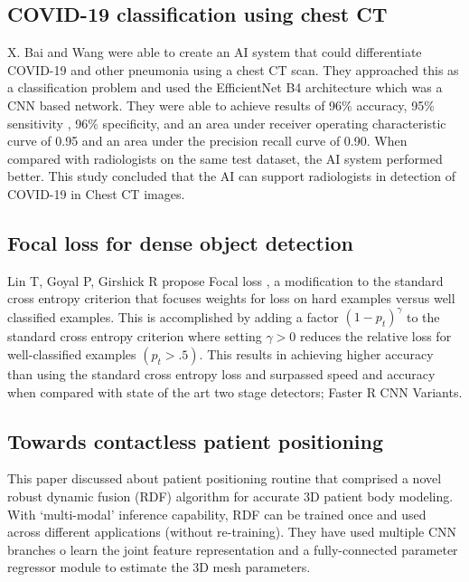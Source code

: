 \documentclass{sigkddExp}
\begin{document}
\subsection{COVID-19 classification using chest CT}

X. Bai and Wang \cite{pmid32339081} were able to create an AI system that could
differentiate COVID-19 and other pneumonia using a chest CT scan. They
approached this as a classification problem and used the EfficientNet B4
architecture which was a CNN based network. They were able to achieve results of
96\% accuracy, 95\% sensitivity , 96\% specificity, and an area under receiver
operating characteristic curve of 0.95 and an area under the precision recall
curve of 0.90. When compared with radiologists on the same test dataset, the AI
system performed better. This study concluded that the AI can support
radiologists in detection of COVID-19 in Chest CT images.

\subsection{Focal loss for dense object detection}

Lin T, Goyal P, Girshick R propose Focal loss \cite{lin2018focal}, a
modification to the standard cross entropy criterion that focuses weights for
loss on hard examples versus well classified examples. This is accomplished by
adding a factor $(1 - p_t)^\gamma$ to the standard cross entropy criterion where
setting $\gamma  > 0$ reduces the relative loss for well-classified examples
$(p_t > .5)$. This results in achieving higher accuracy than using the standard
cross entropy loss and surpassed speed and accuracy when compared with state of
the art two stage detectors; Faster R CNN Variants.


\subsection{Towards contactless patient positioning}

This paper \cite{9084097} discussed about patient positioning routine that
comprised a novel robust dynamic fusion (RDF) algorithm for accurate 3D patient
body modeling. With ‘multi-modal’ inference capability, RDF can be trained once
and used across different applications (without re-training). They have used
multiple CNN branches o learn the joint feature representation and a
fully-connected parameter regressor module to estimate the 3D mesh parameters.
\end{document}
